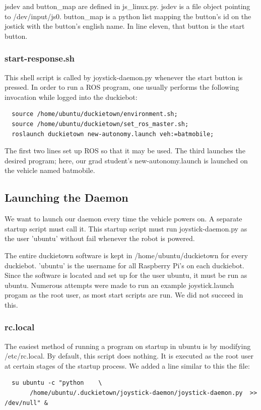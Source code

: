 \documentclass[titlepage]{article}
\begin{document}
jsdev and button\_map are defined in js\_linux.py. jsdev is a file object pointing to /dev/input/js0. button\_map is a python list mapping the button's id on the jostick with the button's english name. In line eleven, that button is the start button. 
\subsubsection{start-response.sh}
This shell script is called by joystick-daemon.py whenever the start button is pressed. In order to run a ROS program, one usually performs the following invocation while logged into the duckiebot:

\begin{lstlisting}
  source /home/ubuntu/duckietown/environment.sh;
  source /home/ubuntu/duckietown/set_ros_master.sh;
  roslaunch duckietown new-autonomy.launch veh:=batmobile;
\end{lstlisting}

The first two lines set up ROS so that it may be used. The third  launches the desired program; here, our grad student's new-autonomy.launch is launched on the vehicle named batmobile.

\subsection{Launching the Daemon} 
We want to launch our daemon every time the vehicle powers on. A separate startup script must call it. This startup script must run joystick-daemon.py as the user 'ubuntu' without fail whenever the robot is powered. 

The entire duckietown software is kept in /home/ubuntu/duckietown for every duckiebot. 'ubuntu' is the username for all Raspberry Pi's on each duckiebot. Since the software is located and set up for the user ubuntu, it must be run as ubuntu. Numerous attempts were made to run an example joystick.launch progam as the root user, as most start scripts are run. We did not succeed in this.

\subsubsection{rc.local}
The easiest method of running a program on startup in ubuntu is by modifying /etc/rc.local. By default, this script does nothing. It is executed as the root user at certain stages of the startup process. We added a line similar to this the file:
\begin{verbatim}
  su ubuntu -c "python    \
       /home/ubuntu/.duckietown/joystick-daemon/joystick-daemon.py  >> /dev/null" &                                                            
\end{verbatim}
\end{document}
